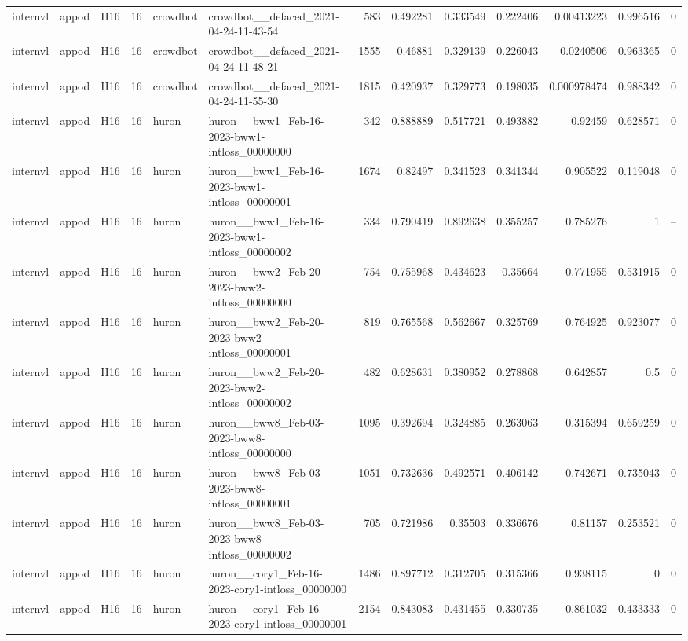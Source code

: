 \begin{longtable}{lllrllrrrrrrr}
internvl & appod & H16 & 16 & crowdbot & crowdbot\_\_defaced\_2021-04-24-11-43-54 & 583 & 0.492281 & 0.333549 & 0.222406 & 0.00413223 & 0.996516 & 0 \\
internvl & appod & H16 & 16 & crowdbot & crowdbot\_\_defaced\_2021-04-24-11-48-21 & 1555 & 0.46881 & 0.329139 & 0.226043 & 0.0240506 & 0.963365 & 0 \\
internvl & appod & H16 & 16 & crowdbot & crowdbot\_\_defaced\_2021-04-24-11-55-30 & 1815 & 0.420937 & 0.329773 & 0.198035 & 0.000978474 & 0.988342 & 0 \\
internvl & appod & H16 & 16 & huron & huron\_\_bww1\_Feb-16-2023-bww1-intloss\_00000000 & 342 & 0.888889 & 0.517721 & 0.493882 & 0.92459 & 0.628571 & 0 \\
internvl & appod & H16 & 16 & huron & huron\_\_bww1\_Feb-16-2023-bww1-intloss\_00000001 & 1674 & 0.82497 & 0.341523 & 0.341344 & 0.905522 & 0.119048 & 0 \\
internvl & appod & H16 & 16 & huron & huron\_\_bww1\_Feb-16-2023-bww1-intloss\_00000002 & 334 & 0.790419 & 0.892638 & 0.355257 & 0.785276 & 1 & -- \\
internvl & appod & H16 & 16 & huron & huron\_\_bww2\_Feb-20-2023-bww2-intloss\_00000000 & 754 & 0.755968 & 0.434623 & 0.35664 & 0.771955 & 0.531915 & 0 \\
internvl & appod & H16 & 16 & huron & huron\_\_bww2\_Feb-20-2023-bww2-intloss\_00000001 & 819 & 0.765568 & 0.562667 & 0.325769 & 0.764925 & 0.923077 & 0 \\
internvl & appod & H16 & 16 & huron & huron\_\_bww2\_Feb-20-2023-bww2-intloss\_00000002 & 482 & 0.628631 & 0.380952 & 0.278868 & 0.642857 & 0.5 & 0 \\
internvl & appod & H16 & 16 & huron & huron\_\_bww8\_Feb-03-2023-bww8-intloss\_00000000 & 1095 & 0.392694 & 0.324885 & 0.263063 & 0.315394 & 0.659259 & 0 \\
internvl & appod & H16 & 16 & huron & huron\_\_bww8\_Feb-03-2023-bww8-intloss\_00000001 & 1051 & 0.732636 & 0.492571 & 0.406142 & 0.742671 & 0.735043 & 0 \\
internvl & appod & H16 & 16 & huron & huron\_\_bww8\_Feb-03-2023-bww8-intloss\_00000002 & 705 & 0.721986 & 0.35503 & 0.336676 & 0.81157 & 0.253521 & 0 \\
internvl & appod & H16 & 16 & huron & huron\_\_cory1\_Feb-16-2023-cory1-intloss\_00000000 & 1486 & 0.897712 & 0.312705 & 0.315366 & 0.938115 & 0 & 0 \\
internvl & appod & H16 & 16 & huron & huron\_\_cory1\_Feb-16-2023-cory1-intloss\_00000001 & 2154 & 0.843083 & 0.431455 & 0.330735 & 0.861032 & 0.433333 & 0 \\

\end{longtable}

